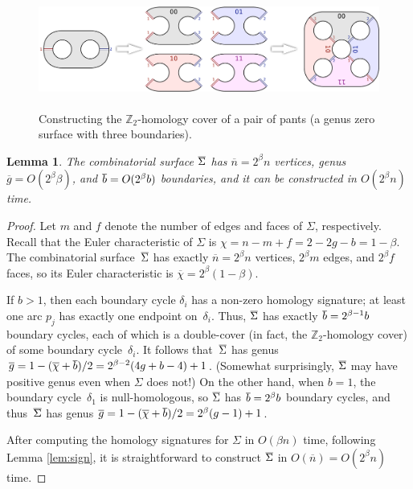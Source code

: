 \documentclass[11pt,twoside]{article}
\def\Z{\mathbb{Z}}
\def\dualarc{p}
\def\Sigmabar{\overline{\smash{\Sigma}\vphantom{t}}}
\def\bbar{\overline{\smash{b}\vphantom{t}}}
\def\nbar{\overline{n}}
\def\gbar{\overline{g}}
\def\chibar{\overline{\chi}}
\newtheorem{lemma}[theorem]{Lemma}
\begin{document}
\begin{figure}
\centering
\includegraphics[height=1.5in]{Fig/hom-cover-example}
\caption{Constructing the $\Z_2$-homology cover of a pair of pants (a genus zero surface with three boundaries).}
\label{fig:cover-ex}
\end{figure}

\begin{lemma}
\label{lem:cover-cxy}
The combinatorial surface $\Sigmabar$ has $\nbar = 2^\beta n$ vertices, genus $\gbar = O(2^\beta \beta)$, and $\bbar = O(2^\beta b)$ boundaries, and it can be constructed in $O(2^\beta n)$ time.
\end{lemma}

\begin{proof}
Let $m$ and $f$ denote the number of edges and faces of $\Sigma$, respectively.  Recall that the Euler characteristic of $\Sigma$ is $\chi = n - m + f = 2 - 2g - b = 1-\beta$.  The combinatorial surface~$\Sigmabar$ has exactly $\nbar = 2^\beta n$ vertices, $2^\beta m$ edges, and $2^\beta f$ faces, so its Euler characteristic is $\chibar = 2^\beta (1-\beta)$.

If $b>1$, then each boundary cycle $\delta_i$ has a non-zero homology signature; at least one arc $\dualarc_j$ has exactly one endpoint on~$\delta_i$.  Thus, $\Sigmabar$ has exactly $\bbar = 2^{\beta-1} b$ boundary cycles, each of which is a double-cover (in fact, the $\Z_2$-homology cover) of some boundary cycle~$\delta_i$.  It follows that~$\Sigmabar$ has genus $\gbar = 1-(\chibar+\bbar)/2 = {2^{\beta-2} ({4g+b-4}) + 1}$.  (Somewhat surprisingly, $\Sigmabar$ may have positive genus even when $\Sigma$ does not!)  On the other hand, when $b=1$, the boundary cycle~$\delta_1$ is null-homologous, so $\Sigmabar$ has $\bbar = 2^\beta b$ boundary cycles, and thus~$\Sigmabar$ has genus $\gbar = {1-(\chibar+\bbar)/2} =  {2^\beta (g-1) + 1}$.

After computing the homology signatures for $\Sigma$ in $O(\beta n)$ time, following Lemma \ref{lem:sign}, it is straightforward to construct $\Sigmabar$ in $O(\nbar) = O(2^\beta n)$ time.
\end{proof}
\end{document}
